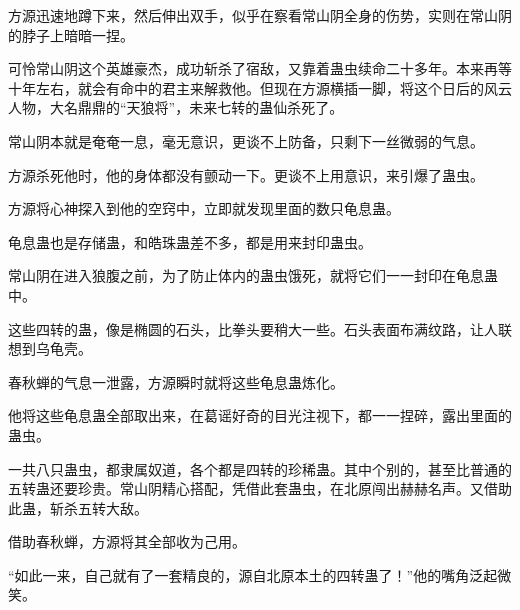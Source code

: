 \begin{this_body}
方源迅速地蹲下来，然后伸出双手，似乎在察看常山阴全身的伤势，实则在常山阴的脖子上暗暗一捏。

可怜常山阴这个英雄豪杰，成功斩杀了宿敌，又靠着蛊虫续命二十多年。本来再等十年左右，就会有命中的君主来解救他。但现在方源横插一脚，将这个日后的风云人物，大名鼎鼎的“天狼将”，未来七转的蛊仙杀死了。

常山阴本就是奄奄一息，毫无意识，更谈不上防备，只剩下一丝微弱的气息。

方源杀死他时，他的身体都没有颤动一下。更谈不上用意识，来引爆了蛊虫。

方源将心神探入到他的空窍中，立即就发现里面的数只龟息蛊。

龟息蛊也是存储蛊，和皓珠蛊差不多，都是用来封印蛊虫。

常山阴在进入狼腹之前，为了防止体内的蛊虫饿死，就将它们一一封印在龟息蛊中。

这些四转的蛊，像是椭圆的石头，比拳头要稍大一些。石头表面布满纹路，让人联想到乌龟壳。

春秋蝉的气息一泄露，方源瞬时就将这些龟息蛊炼化。

他将这些龟息蛊全部取出来，在葛谣好奇的目光注视下，都一一捏碎，露出里面的蛊虫。

一共八只蛊虫，都隶属奴道，各个都是四转的珍稀蛊。其中个别的，甚至比普通的五转蛊还要珍贵。常山阴精心搭配，凭借此套蛊虫，在北原闯出赫赫名声。又借助此蛊，斩杀五转大敌。

借助春秋蝉，方源将其全部收为己用。

“如此一来，自己就有了一套精良的，源自北原本土的四转蛊了！”他的嘴角泛起微笑。

\end{this_body}

